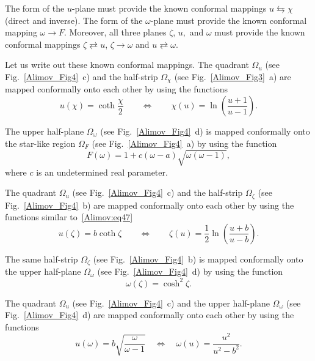 \documentclass[
11pt,%
tightenlines,%
twoside,%
onecolumn,%
nofloats,%
nobibnotes,%
nofootinbib,%
superscriptaddress,%
noshowpacs,%
centertags]%
{revtex4-2}
\begin{document}
The form of the $u$-plane must provide the known conformal mappings $u \leftrightarrows \chi$
(direct and inverse). The form of the $\omega$-plane must provide the known conformal mapping
$\omega \to F$. Moreover, all three planes $\zeta$, $u,$ and $\omega$ must provide the known
conformal mappings $\zeta \rightleftarrows u$, $\zeta \to \omega $ and $u \rightleftarrows \omega$.

Let us write out these known conformal mappings. The quadrant $\Omega_u $ (see
Fig.~\ref{Alimov_Fig4}~c) and the half-strip $\Omega_\chi $ (see Fig.~\ref{Alimov_Fig3}~a) are mapped
conformally onto each other by using the functions~\cite{Alimov:bib13}
\begin{equation}
\label{Alimov:eq47} u(\chi ) = \coth \frac{\chi}{2} \quad \quad \Leftrightarrow \quad \quad \chi
(u) = \ln \left( {\frac{u + 1}{u - 1}} \right).
\end{equation}

The upper half-plane $\Omega_\omega$ (see Fig.~\ref{Alimov_Fig4}~d) is mapped conformally onto the
star-like region $\Omega_F$ (see Fig.~\ref{Alimov_Fig4}~a) by using the function~\cite{Alimov:bib21}
\begin{equation}
\label{Alimov:eq48} F(\omega) = 1 + c(\omega - a)\sqrt {\omega (\omega - 1)},
\end{equation}
where $c$ is an undetermined real parameter.

The quadrant $\Omega_u$ (see Fig.~\ref{Alimov_Fig4}~c) and the half-strip $\Omega_\zeta$ (see
Fig.~\ref{Alimov_Fig4}~b) are mapped conformally onto each other by using the functions similar
to~\eqref{Alimov:eq47}
\begin{equation}
\label{Alimov:eq49} u(\zeta) = b\coth \zeta \quad \quad \Leftrightarrow \quad \quad \zeta (u) =
\frac{1}{2}\ln \left( {\frac{u + b}{u - b}} \right).
\end{equation}

The same half-strip $\Omega_\zeta$ (see Fig.~\ref{Alimov_Fig4}~b) is mapped conformally onto the
upper half-plane $\Omega_\omega$ (see Fig.~\ref{Alimov_Fig4}~d) by using the
function~\cite{Alimov:bib13}
\begin{equation}
\label{Alimov:eq50} \omega (\zeta ) = \cosh ^2\zeta.
\end{equation}

The quadrant $\Omega_u $ (see Fig.~\ref{Alimov_Fig4}~c) and the upper half-plane $\Omega_\omega$ (see
Fig.~\ref{Alimov_Fig4}~d) are mapped conformally onto each other by using the
functions~\cite{Alimov:bib19}
\begin{equation}
\label{Alimov:eq51} u(\omega) = b\sqrt {\frac{\omega}{\omega - 1}} \quad \Leftrightarrow \quad
\omega(u) = \frac{u^2}{u^2 - b^2}.
\end{equation}
\end{document}
